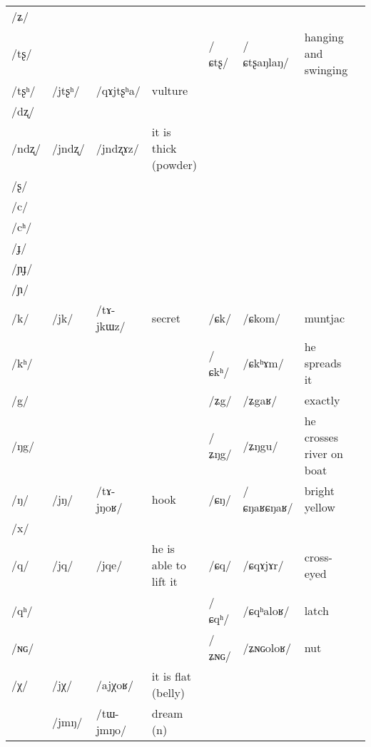 \documentclass[oldfontcommands,oneside,a4paper,11pt]{article}
\newcommand{\ipa}[1]{/#1/} %
\newcommand{\deux}[1]{/#1/}
\newcommand{\trois}[1]{/#1/}
\newcommand{\idph}[1]{\cellcolor{gray}\textbf{#1}}
\begin{document}
\begin{table}
{\begin{tabular}{l|lll|lll|l}
\ipa{ʑ}  & 	  & 	  & 	  & 	  & 	  & 	  & 	\\
\ipa{tʂ}  & 	  & 	  & 	  & 	 \deux{ɕtʂ} \idph{}  & 	 \ipa{ɕtʂaŋlaŋ}  & 	 hanging and swinging & 	\\
\ipa{tʂʰ}  & 	 \deux{jtʂʰ}  & 	 \ipa{qɤjtʂʰa}  & 	vulture  & 	  & 	  & 	  & 	\\
\ipa{dʐ}  & 	  & 	  & 	  & 	  & 	  & 	  & 	\\
\ipa{ndʐ}  & 	 \deux{jndʐ}  & 	 \ipa{jndʐɤz}  & 	it is thick (powder)  & 	  & 	  & 	  & 	\\
\ipa{ʂ}  & 	  & 	  & 	  & 	  & 	  & 	  & 	\\
\ipa{c}  & 	  & 	  & 	  & 	  & 	  & 	  & 	\\
\ipa{cʰ}  & 	  & 	  & 	  & 	  & 	  & 	  & 	\\
\ipa{ɟ}  & 	  & 	  & 	  & 	  & 	  & 	  & 	\\
\ipa{ɲɟ}  & 	  & 	  & 	  & 	  & 	  & 	  & 	\\
\ipa{ɲ}  & 	  & 	  & 	  & 	  & 	  & 	  & 	\\
\ipa{k}  &	 \deux{jk}  &	 \ipa{tɤ-jkɯz}  &	 secret  &	 \deux{ɕk}  &	 \ipa{ɕkom}  &	 muntjac  &	\\
\ipa{kʰ}  &	  &	  &	  &	 \deux{ɕkʰ}  &	 \ipa{ɕkʰɤm}  &	 he spreads it  &	\\
\ipa{g}  &	  &	  &	  &	 \deux{ʑg}  &	 \ipa{ʑgaʁ}  &	 exactly  &	\\
\ipa{ŋg}  &	  &	  &	  &	 \deux{ʑŋg}  &	 \ipa{ʑŋgu}  &	 he crosses river on boat  &	\\
\ipa{ŋ}  &	 \deux{jŋ}  &	 \ipa{tɤ-jŋoʁ}  &	 hook  &	 \deux{ɕŋ} \idph{}  &	 \ipa{ɕŋaʁɕŋaʁ}  &	 bright yellow  &	\\
\ipa{x}  &	  &	  &	  &	  &	  &	  &	\\
\ipa{q}  &	 \deux{jq}  &	 \ipa{jqe}  &	 he is able to lift it  &	 \deux{ɕq}  &	 \ipa{ɕqɤjɤr}  &	 cross-eyed  &	\\
\ipa{qʰ}  &	  &	  &	  &	 \deux{ɕqʰ}  &	 \ipa{ɕqʰaloʁ}  &	 latch  &	\\
\ipa{ɴɢ}  &	  &	  &	  &	 \deux{ʑɴɢ}  &	 \ipa{ʑɴɢoloʁ}  &	 nut  &	\\
\ipa{χ}  &	 \deux{jχ}  &	 \ipa{ajχoʁ}  &	 it is flat (belly)  &	  &	  &	  &	\\
\midrule  					 
 &\trois{jmŋ} & \ipa{tɯ-jmŋo} &dream (n) \\  
  \end{tabular}}
\end{table}
  
\end{document}
